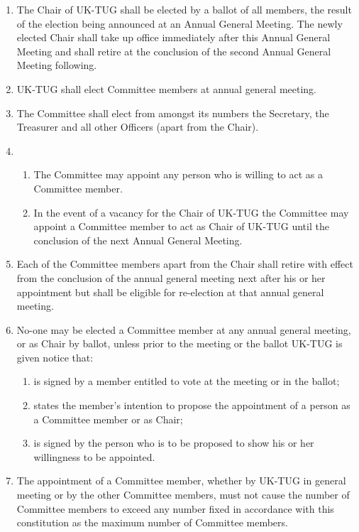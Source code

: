 \documentclass[a4paper,11pt]{article}
\begin{document}
\begin{enumerate}
\item The Chair of UK-TUG shall be elected by a ballot of all
  members, the result of the election being announced at an Annual
  General Meeting.  The newly elected Chair shall take up office
  immediately after this Annual General Meeting and shall retire at
  the conclusion of the second Annual General Meeting following.
\item UK-TUG shall elect Committee members at annual general meeting.
\item The Committee shall elect from amongst its numbers the Secretary, the
  Treasurer and all other Officers (apart from the Chair).
\item 
  \begin{enumerate}
    \item The Committee may appoint any person who is willing to act as a Committee
      member.
    \item In the event of a vacancy for the Chair of UK-TUG
      the Committee may appoint a Committee member to act as Chair of
      UK-TUG until the conclusion of the next Annual General Meeting.
  \end{enumerate}
\item Each of the Committee members apart from the Chair shall retire with
  effect from the conclusion of the annual general meeting next after his or her
  appointment but shall be eligible for re-election at that annual general
  meeting.
\item No-one may be elected a Committee member at any annual
  general meeting, or as Chair by ballot, unless prior to the meeting or the ballot 
  UK-TUG is given notice that:
  \begin{enumerate}
  \item is signed by a member entitled to vote at the meeting or in the ballot;
  \item states the member's intention to propose the appointment of a person as a
    Committee member or as Chair;
  \item is signed by the person who is to be proposed to show his or her
    willingness to be appointed.
  \end{enumerate}
\item The appointment of a Committee member, whether by UK-TUG in general
  meeting or by the other Committee members, must not cause the number of
  Committee members to exceed any number fixed in accordance with this
  constitution as the maximum number of Committee members.
\end{enumerate}
\end{document}
